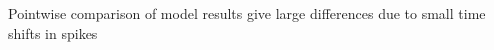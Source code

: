 \documentclass[presentation]{beamer}
\begin{document}
\begin{frame}{Pointwise comparison of model results give large differences
  due to small time shifts in spikes}

  \begin{figure}
  \end{figure}

\end{frame}
\end{document}
